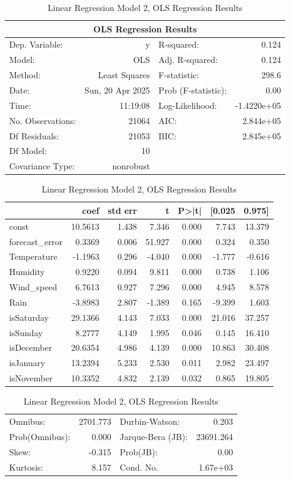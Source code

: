 \documentclass[mstat,12pt]{unswthesis}
\begin{document}
\begin{table}[H]
\centering
\caption{Linear Regression Model 2, OLS Regression Results}
\begin{tabular}{lr|lr}
\hline
\hline
\multicolumn{4}{c}{OLS Regression Results} \\
\hline
\hline
Dep. Variable: & y & R-squared: & 0.124 \\
Model: & OLS & Adj. R-squared: & 0.124 \\
Method: & Least Squares & F-statistic: & 298.6 \\
Date: & Sun, 20 Apr 2025 & Prob (F-statistic): & 0.00 \\
Time: & 11:19:08 & Log-Likelihood: & -1.4220e+05 \\
No. Observations: & 21064 & AIC: & 2.844e+05 \\
Df Residuals: & 21053 & BIC: & 2.845e+05 \\
Df Model: & 10 & & \\                                         
Covariance Type: & nonrobust & & \\
\hline
\hline
\end{tabular}

\begin{tabular}{lrrrrrr}
  & coef & std err & t & P>|t| & [0.025 & 0.975]  \\
\hline
const & 10.5613 & 1.438 & 7.346 & 0.000 & 7.743 & 13.379  \\
forecast\_error & 0.3369 & 0.006 & 51.927 & 0.000 & 0.324 & 0.350 \\
Temperature & -1.1963 & 0.296 & -4.040 & 0.000 & -1.777 & -0.616  \\
Humidity & 0.9220 & 0.094 & 9.811 & 0.000 & 0.738 & 1.106  \\
Wind\_speed & 6.7613 & 0.927 & 7.296 & 0.000 & 4.945 & 8.578  \\
Rain & -3.8983 & 2.807 & -1.389 & 0.165 & -9.399 & 1.603  \\
isSaturday & 29.1366 & 4.143 & 7.033 & 0.000 & 21.016 & 37.257 \\
isSunday & 8.2777 & 4.149 & 1.995 & 0.046 & 0.145 & 16.410  \\
isDecember & 20.6354 & 4.986 & 4.139 & 0.000 & 10.863 & 30.408  \\
isJanuary & 13.2394 & 5.233 & 2.530 & 0.011 & 2.982 & 23.497  \\
isNovember & 10.3352 & 4.832 & 2.139 & 0.032 & 0.865 & 19.805  \\
\hline
\hline
\end{tabular}

\begin{tabular}{lrlr}
Omnibus: & 2701.773 & Durbin-Watson: & 0.203 \\
Prob(Omnibus): & 0.000 & Jarque-Bera (JB): & 23691.264 \\
Skew: & -0.315 & Prob(JB): & 0.00 \\
Kurtosis: & 8.157 & Cond. No. & 1.67e+03\\
\hline
\hline
\end{tabular}
\label{tab:tab5}
\end{table}
\end{document}
